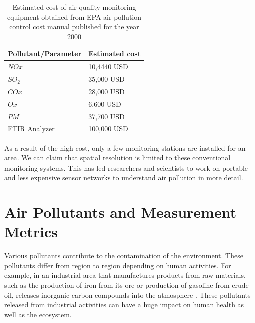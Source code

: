 \begin{table}[h]
   
   
     \begin{tabularx}{\columnwidth}{X|X}
         \hline
         Pollutant/Parameter           & Estimated cost    \\
         \hline
     
       $NOx$   & 10,4440         USD \\ 
       $SO_2$   & 35,000          USD \\ 
       $COx$   & 28,000          USD\\ 
       $Ox$   & 6,600            USD\\ 
       $PM$   & 37,700           USD\\ 
      
       FTIR Analyzer   & 100,000 USD\\ \hline
      
         
       
   \end{tabularx}
     \caption{Estimated cost of air quality monitoring equipment obtained from EPA air pollution control cost manual published for the year 2000 \cite{Mussatti2000}}
     \label{table:cost}
   \end{table}
 
 
   \hspace{1 cm}

 As a result of the high cost, only a few monitoring stations are installed for an area. We can claim that spatial resolution is limited to these conventional monitoring systems. This has led researchers and scientists to work on portable and less expensive sensor networks to understand air pollution in more detail.
 


 
\section{Air Pollutants and Measurement Metrics}


Various pollutants contribute to the contamination of the environment. These pollutants differ from region to region depending on human activities. For example, in an industrial area that manufactures products from raw materials, such as the production of iron from its ore or production of gasoline from crude oil, releases inorganic carbon compounds into the atmosphere \cite{Vallero2014}. These pollutants released from industrial activities can have a huge impact on human health as well as the ecosystem.  %



